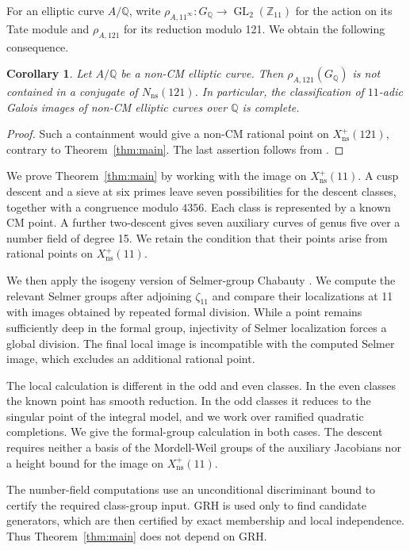 \documentclass[11pt,reqno]{amsart}
\newcommand{\Q}{\mathbb Q}\newcommand{\Z}{\mathbb Z}
\newcommand{\ns}{\mathrm{ns}}\newcommand{\GL}{\operatorname{GL}}
\newcommand{\Xns}[1]{X_{\ns}^{+}(#1)}
\newtheorem{corollary}[theorem]{Corollary}
\theoremstyle{definition}\newtheorem{definition}[theorem]{Definition}
\theoremstyle{remark}\newtheorem{remark}[theorem]{Remark}
\numberwithin{equation}{section}
\begin{document}
For an elliptic curve \(A/\Q\), write
\(\rho_{A,11^\infty}:G_\Q\to\GL_2(\Z_{11})\) for the action on
its Tate module and \(\rho_{A,121}\) for its reduction modulo 121.
We obtain the following consequence.

\begin{corollary}\label{cor:images}
Let \(A/\Q\) be a non-CM elliptic curve. Then
\(\rho_{A,121}(G_\Q)\) is not contained in a conjugate of
\(N_{\ns}(121)\). In particular, the classification of
\(11\)-adic Galois images of non-CM elliptic curves over \(\Q\)
is complete.
\end{corollary}
\begin{proof}
Such a containment would give a non-CM rational point on
\(\Xns{121}\), contrary to Theorem~\ref{thm:main}. The last
assertion follows from \cite[Theorem 1.6]{RSZB}.
\end{proof}

We prove Theorem~\ref{thm:main} by working with the image on
\(\Xns{11}\). A cusp descent and a sieve at six primes leave
seven possibilities for the descent classes, together with a
congruence modulo \(4356\). Each class is represented by a known
CM point. A further two-descent gives seven auxiliary curves of
genus five over a number field of degree 15. We retain the
condition that their points arise from rational points on
\(\Xns{11}\).

We then apply the isogeny version of Selmer-group Chabauty
\cite[Theorem 2.1 and Remark 2.2]{Stoll}. We compute the relevant
Selmer groups after adjoining \(\zeta_{11}\) and compare their
localizations at 11 with images obtained by repeated formal
division. While a point remains sufficiently deep in the formal
group, injectivity of Selmer localization forces a global
division. The final local image is incompatible with the computed
Selmer image, which excludes an additional rational point.

The local calculation is different in the odd and even classes.
In the even classes the known point has smooth reduction. In the
odd classes it reduces to the singular point of the integral
model, and we work over ramified quadratic completions. We give
the formal-group calculation in both cases. The descent requires
neither a basis of the Mordell-Weil groups of the auxiliary
Jacobians nor a height bound for the image on \(\Xns{11}\).

The number-field computations use an unconditional discriminant
bound to certify the required class-group input. GRH is used only
to find candidate generators, which are then certified by exact
membership and local independence. Thus Theorem~\ref{thm:main}
does not depend on GRH.
\end{document}
